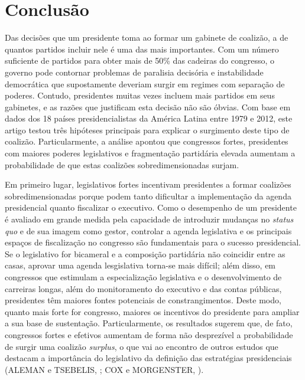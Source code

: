 \section{Conclusão}
\label{sec:conclusao}

Das decisões que um presidente toma ao formar um gabinete de coalizão, a de quantos partidos incluir nele é uma das mais importantes. Com um número suficiente de partidos para obter mais de 50\% das cadeiras do congresso, o governo pode contornar problemas de paralisia decisória e instabilidade democrática que supostamente deveriam surgir em regimes com separação de poderes. Contudo, presidentes muitas vezes incluem mais partidos em seus gabinetes, e as razões que justificam esta decisão não são óbvias. Com base em dados dos 18 países presidencialistas da América Latina entre 1979 e 2012, este artigo testou três hipóteses principais para explicar o surgimento deste tipo de coalizão. Particularmente, a análise apontou que congressos fortes, presidentes com maiores poderes legislativos e fragmentação partidária elevada aumentam a probabilidade de que estas coalizões sobredimensionadas surjam.

Em primeiro lugar, legislativos fortes incentivam presidentes a formar coalizões sobredimensionadas porque podem tanto dificultar a implementação da agenda presidencial quanto fiscalizar o executivo. Como o desempenho de um presidente é avaliado em grande medida pela capacidade de introduzir mudanças no \textit{status quo} e de sua imagem como gestor, controlar a agenda legislativa e os principais espaços de fiscalização no congresso são fundamentais para o sucesso presidencial. Se o legislativo for bicameral e a composição partidária não coincidir entre as casas, aprovar uma agenda lesgislativa torna-se mais difícil; além disso, em congressos que estimulam a especialização legislativa e o desenvolvimento de carreiras longas, além do monitoramento do executivo e das contas públicas, presidentes têm maiores fontes potenciais de constrangimentos. Deste modo, quanto mais forte for congresso, maiores os incentivos do presidente para ampliar a sua base de sustentação. Particularmente, os resultados sugerem que, de fato, congressos fortes e efetivos aumentam de forma não desprezível a probabilidade de surgir uma coalizão \textit{surplus}, o que vai ao encontro de outros estudos que destacam a importância do legislativo da definição das estratégias presidenciais (ALEMAN e TSEBELIS, \citeyear{aleman2011}; COX e MORGENSTER, \citeyear{cox2001}).

